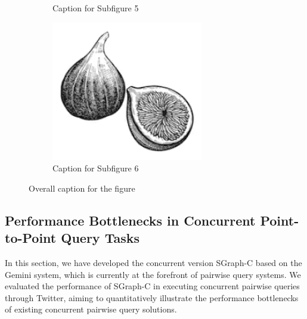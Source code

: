\documentclass[lettersize,journal]{IEEEtran} %
\begin{document}
\begin{figure}[!t]
\begin{subfigure}{0.3\columnwidth}
      \caption{Caption for Subfigure 5}
      \label{fig:subfig5}
    \end{subfigure}
    \hfill
    \begin{subfigure}{0.3\columnwidth}
      \includegraphics[width=\linewidth]{fig1.png}
      \caption{Caption for Subfigure 6}
      \label{fig:subfig6}
    \end{subfigure}
  
    \caption{Overall caption for the figure}
    \label{fig:overall}
  \end{figure}
  
  

\subsection{Performance Bottlenecks in Concurrent Point-to-Point Query Tasks}
In this section, we have developed the concurrent version SGraph-C based on the Gemini system, which is currently at the forefront of pairwise query systems. We evaluated the performance of SGraph-C in executing concurrent pairwise queries through Twitter, aiming to quantitatively illustrate the performance bottlenecks of existing concurrent pairwise query solutions.
\end{document}

